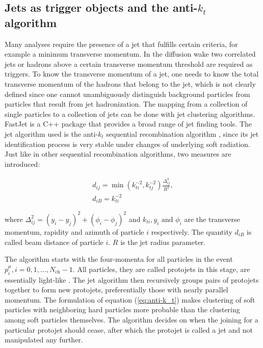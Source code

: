 \documentclass[
  a4paper,
  12pt,
  oneside,
  parskip=half,
  listof=totoc,
  bibliography=totoc,
  DIV=12,
  numbers=noenddot,
  BA.tex
  ]{subfiles}
\begin{document}
\subsection{Jets as trigger objects and the anti-$k_t$ algorithm}
\label{sec:antikt}

Many analyses require the presence of a jet that fulfills certain criteria, for example a minimum transverse momentum. In the diffusion wake two correlated jets or hadrons above a certain transverse momentum threshold are required as triggers. To know the transverse momentum of a jet, one needs to know the total transverse momentum of the hadrons that belong to the jet, which is not clearly defined since one cannot unambiguously distinguish background particles from particles that result from jet hadronization. The mapping from a collection of single particles to a collection of jets can be done with jet clustering algorithms. FastJet \cite{cacciari_fastjet_2012} is a C++ package that provides a broad range of jet finding tools. The jet algorithm used is the anti-$k_t$ sequential recombination algorithm \cite{cacciari_anti-_2008}, since its jet identification process is very stable under changes of underlying soft radiation. Just like in other sequential recombination algorithms, two measures are introduced:

\begin{equation}
	\begin{gathered}
		d_{ij} = \min \left(k_{ti}^{-2}, k_{tj}^{-2}\right) \frac{\Delta_{ij}^2}{R^2}, \\
		d_{iB} = k_{ti}^{-2}
	\end{gathered}
	\label{eq:anti-k_t}
\end{equation}

where $\Delta_{ij}^2 = (y_i - y_j)^2 + (\phi_i - \phi_j)^2$ and $k_{ti}, y_i \text{ and } \phi_i$ are the transverse momentum, rapidity and azimuth of particle $i$ respectively. The quantity $d_{iB}$ is called beam distance of particle $i$. $R$ is the jet radius parameter.

The algorithm starts with the four-momenta for all particles in the event \\ $p_i^\mu, i = 0,1,\dots, N_\text{ch}-1$. All particles, they are called protojets in this stage, are essentially light-like \cite{ellis_successive_1993}. The jet algorithm then recursively groups pairs of protojets together to form new protojets, preferentially those with nearly parallel momentum. The formulation of equation (\ref{eq:anti-k_t}) makes clustering of soft particles with neighboring hard particles more probable than the clustering among soft particles themselves. The algorithm decides on when the joining for a particular protojet should cease, after which the protojet is called a jet and not manipulated any further.
\end{document}
